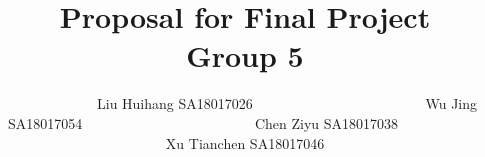 
\title{
    Proposal for Final Project \\{\vspace{1em} \small Group 5}
}

\author{\name $\quad\quad\quad\quad\quad\quad$Liu Huihang   {\email SA18017026$\quad\quad\quad\quad\quad\quad$}
        \AND
        \name $\quad\quad\quad\quad\quad\quad$Wu Jing       {\email SA18017054$\quad\quad\quad\quad\quad\quad$}
        \AND
        \name $\quad\quad\quad\quad\quad\quad$Chen Ziyu     {\email SA18017038$\quad\quad\quad\quad\quad\quad$}
        \AND
        \name $\quad\quad\quad\quad\quad\quad$Xu Tianchen   {\email SA18017046$\quad\quad\quad\quad\quad\quad$}
}


\maketitle